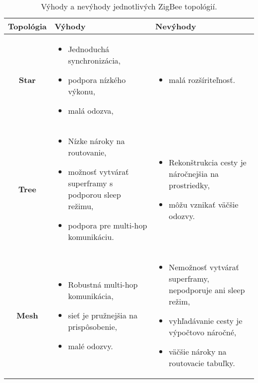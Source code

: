 \documentclass[12pt,a4wide,oneside,openright]{report}
\begin{document}
\singlespacing
\begin{table}
	\caption{Výhody a nevýhody jednotlivých ZigBee topológií. \cite{zigbeebook}} 
	\label{table:zigbee_arch}
	\begin{tabularx}{\textwidth}{|c|Y|Y|}
		\hline
		\textbf{Topológia} & \textbf{Výhody} & \textbf{Nevýhody} \\
		\hline
		\textbf{Star} & 
		\singlespacing
		\begin{itemize}
			\item Jednoduchá synchronizácia,
			\item podpora nízkého výkonu,
			\item malá odozva,
		\end{itemize}
		&  
		\begin{itemize}
			\item malá rozšíriteľnosť.
		\end{itemize}
		\\
		\hline
		\textbf{Tree} & 
		\begin{itemize}
			\item Nízke nároky na routovanie,
			\item možnosť vytvárať superframy s podporou sleep režimu,
			\item podpora pre multi-hop komunikáciu.
		\end{itemize}
		&
		\begin{itemize}
			\item Rekonštrukcia cesty je náročnejšia na prostriedky,
			\item môžu vznikať väčšie odozvy.
		\end{itemize}
		\\
		\hline
		\textbf{Mesh} &
		\begin{itemize}
			\item Robustná multi-hop komunikácia,
			\item sieť je pružnejšia na prispôsobenie,
			\item malé odozvy.
		\end{itemize} & 
		\begin{itemize}
			\item Nemožnosť vytvárať superframy, nepodporuje ani sleep režim,
			\item vyhľadávanie cesty je výpočtovo náročné,
			\item väčšie nároky na routovacie tabuľky.
		\end{itemize} \\
		\hline
	\end{tabularx}
\end{table}
\onehalfspacing
\end{document}
